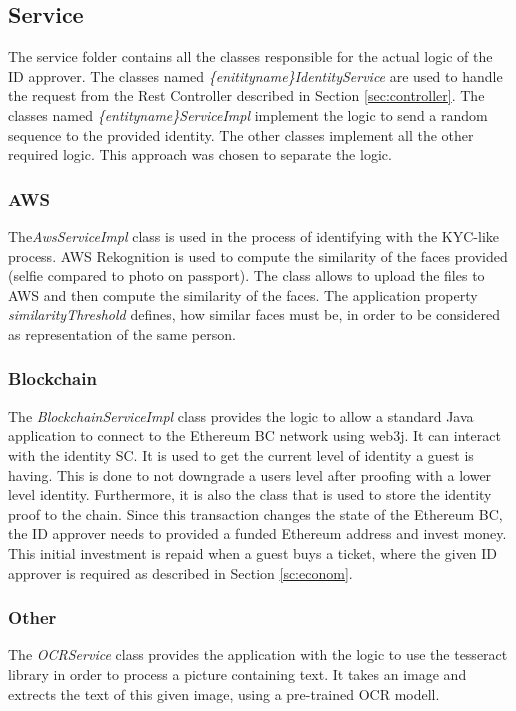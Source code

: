 \subsection{Service}
The service folder contains all the classes responsible for the actual logic of the ID approver. The classes named \textit{\{enitityname\}IdentityService} are used to handle the request from the Rest Controller described in Section \ref{sec:controller}. The classes named \textit{\{entityname\}ServiceImpl} implement the logic to send a random sequence to the provided identity.
The other classes implement all the other required logic. This approach was chosen to separate the logic. 

\subsubsection{AWS}
The\textit{AwsServiceImpl} class is used in the process of identifying with the KYC-like process. AWS Rekognition is used to compute the similarity of the faces provided (selfie compared to photo on passport). The class allows to upload the files to AWS and then compute the similarity of the faces. The application property \textit{similarityThreshold} defines, how similar faces must be, in order to be considered as representation of the same person.

\subsubsection{Blockchain}
The \textit{BlockchainServiceImpl} class provides the logic to allow a standard Java application to connect to the Ethereum BC network using web3j. It can interact with the identity SC. It is used to get the current level of identity a guest is having. This is done to not downgrade a users level after proofing with a lower level identity. Furthermore, it is also the class that is used to store the identity proof to the chain. Since this transaction changes the state of the Ethereum BC, the ID approver needs to provided a funded Ethereum address and invest money. This initial investment is repaid when a guest buys a ticket, where the given ID approver is required as described in Section \ref{sc:econom}.

\subsubsection{Other}
The \textit{OCRService} class provides the application with the logic to use the tesseract library in order to process a picture containing text. It takes an image and extrects the text of this given image, using a pre-trained OCR modell. 

